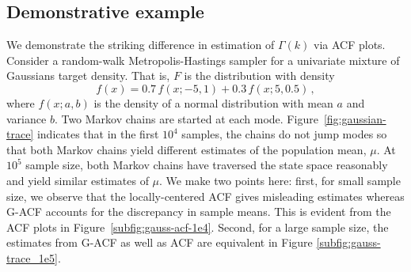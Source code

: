 \documentclass[11pt]{article}
\theoremstyle{remark}
\newtheorem{example}{Example}
\begin{document}

\subsection{Demonstrative example} %
\label{sub:demonstrative_example}


We demonstrate the striking difference in estimation of $\Gamma(k)$ via ACF plots. Consider a random-walk Metropolis-Hastings sampler for a univariate mixture of Gaussians target density. That is, $F$ is the distribution with density
\[
f(x) = 0.7\,f(x; -5, 1) + 0.3\,f(x; 5, 0.5)\,,
\]
where $f(x; a,b)$ is the density of a normal distribution with mean $a$ and variance $b$. 
Two Markov chains are started at each mode.  Figure~\ref{fig:gaussian-trace} indicates that in the first $10^4$ samples, the chains do not jump modes so that both Markov chains yield different estimates of the population mean, $\mu$. At $10^5$ sample size, both Markov chains have traversed the state space reasonably and yield similar estimates of $\mu$. We make two points here: first, for small sample size, we observe that the locally-centered ACF gives misleading estimates   whereas G-ACF accounts for the discrepancy in sample means. This is evident from the ACF plots  in Figure~\ref{subfig:gauss-acf-1e4}. Second, for a large sample size, the estimates from G-ACF as well as ACF are equivalent in Figure \ref{subfig:gauss-trace_1e5}.
\end{document}
